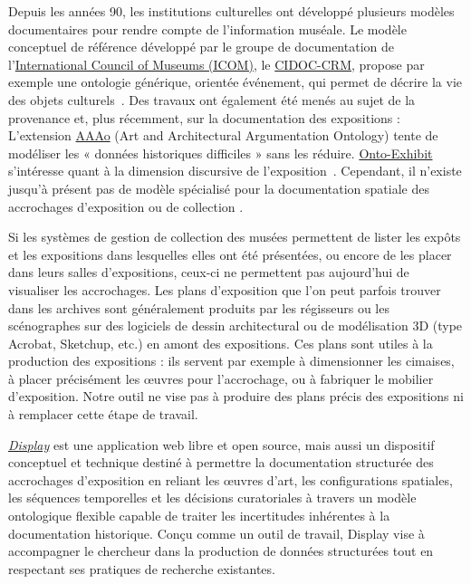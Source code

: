 \documentclass[fra, final]{anthology-ch}         %
\begin{document}
Depuis les années 90, les institutions culturelles ont développé plusieurs modèles documentaires pour rendre compte de l’information muséale. Le modèle conceptuel de référence développé par le groupe de documentation de l’\href{cidoc.mini.icom.museum}{International Council of Museums (ICOM)}, le \href{https://cidoc-crm.org/versions-of-the-cidoc-crm}{CIDOC-CRM}, propose par exemple une ontologie générique, orientée événement, qui permet de décrire la vie des objets culturels~\cite{bruseker2015semantically,bruseker2017cultural}. Des travaux ont également été menés au sujet de la provenance et, plus récemment, sur la documentation des expositions : L’extension \href{https://ontome.net/namespace/336}{AAAo} (Art and Architectural Argumentation Ontology) tente de modéliser les « données historiques difficiles » sans les réduire. \href{https://github.com/iArtHis-Lab/OntoExhibit}{Onto-Exhibit} s’intéresse quant à la dimension discursive de l’exposition~\cite{garcia2023ontoexhibit}. Cependant, il n’existe jusqu’à présent pas de modèle spécialisé pour la documentation spatiale des accrochages d’exposition ou de collection \cite{carboni2023integrer}. 

Si les systèmes de gestion de collection des musées permettent de lister les expôts et les expositions dans lesquelles elles ont été présentées, ou encore de les placer dans leurs salles d’expositions, ceux-ci ne permettent pas aujourd’hui de visualiser les accrochages. Les plans d’exposition que l’on peut parfois trouver dans les archives sont généralement produits par les régisseurs ou les scénographes sur des logiciels de dessin architectural ou de modélisation 3D (type Acrobat, Sketchup, etc.) en amont des expositions. Ces plans sont utiles à la production des expositions : ils servent par exemple à dimensionner les cimaises, à placer précisément les œuvres pour l’accrochage, ou à fabriquer le mobilier d’exposition. Notre outil ne vise pas à produire des plans précis des expositions ni à remplacer cette étape de travail.

\textit{\href{https://ouvroir.umontreal.ca/projets/display}{Display}} est une application web libre et open source, mais aussi un dispositif conceptuel et technique destiné à permettre la documentation structurée des accrochages d’exposition en reliant les œuvres d’art, les configurations spatiales, les séquences temporelles et les décisions curatoriales à travers un modèle ontologique flexible capable de traiter les incertitudes inhérentes à la documentation historique. Conçu comme un outil de travail, Display vise à accompagner le chercheur dans la production de données structurées tout en respectant ses pratiques de recherche existantes.
\end{document}
